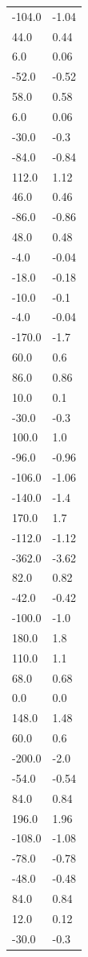 \begin{longtable}{ll}
-104.0 & -1.04 \\
44.0 & 0.44 \\
6.0 & 0.06 \\
-52.0 & -0.52 \\
58.0 & 0.58 \\
6.0 & 0.06 \\
-30.0 & -0.3 \\
-84.0 & -0.84 \\
112.0 & 1.12 \\
46.0 & 0.46 \\
-86.0 & -0.86 \\
48.0 & 0.48 \\
-4.0 & -0.04 \\
-18.0 & -0.18 \\
-10.0 & -0.1 \\
-4.0 & -0.04 \\
-170.0 & -1.7 \\
60.0 & 0.6 \\
86.0 & 0.86 \\
10.0 & 0.1 \\
-30.0 & -0.3 \\
100.0 & 1.0 \\
-96.0 & -0.96 \\
-106.0 & -1.06 \\
-140.0 & -1.4 \\
170.0 & 1.7 \\
-112.0 & -1.12 \\
-362.0 & -3.62 \\
82.0 & 0.82 \\
-42.0 & -0.42 \\
-100.0 & -1.0 \\
180.0 & 1.8 \\
110.0 & 1.1 \\
68.0 & 0.68 \\
0.0 & 0.0 \\
148.0 & 1.48 \\
60.0 & 0.6 \\
-200.0 & -2.0 \\
-54.0 & -0.54 \\
84.0 & 0.84 \\
196.0 & 1.96 \\
-108.0 & -1.08 \\
-78.0 & -0.78 \\
-48.0 & -0.48 \\
84.0 & 0.84 \\
12.0 & 0.12 \\
-30.0 & -0.3 \\

\end{longtable}
